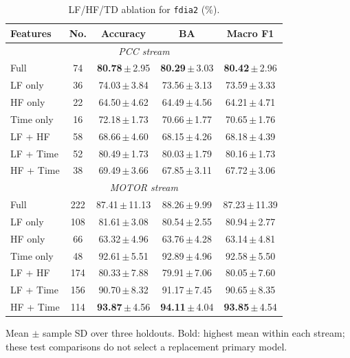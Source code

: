\documentclass[letterpaper,journal]{IEEEtran}
\begin{document}
\begin{table}[t]
\centering
\footnotesize
\caption{LF/HF/TD ablation for \texttt{fdia2} (\%).}
\label{tab:lfhf_ablation_anomaly2}
\renewcommand{\arraystretch}{1.15}
\setlength{\tabcolsep}{2.2pt}
\begin{tabular}{@{}lcccc@{}}
\hline
Features & No. & Accuracy & BA & Macro F1 \\\hline
\hline\multicolumn{5}{c}{\textit{PCC stream}} \\\hline
Full & 74 & \mbox{\textbf{80.78}\,$\pm$\,2.95} & \mbox{\textbf{80.29}\,$\pm$\,3.03} & \mbox{\textbf{80.42}\,$\pm$\,2.96} \\
LF only & 36 & \mbox{74.03\,$\pm$\,3.84} & \mbox{73.56\,$\pm$\,3.13} & \mbox{73.59\,$\pm$\,3.33} \\
HF only & 22 & \mbox{64.50\,$\pm$\,4.62} & \mbox{64.49\,$\pm$\,4.56} & \mbox{64.21\,$\pm$\,4.71} \\
Time only & 16 & \mbox{72.18\,$\pm$\,1.73} & \mbox{70.66\,$\pm$\,1.77} & \mbox{70.65\,$\pm$\,1.76} \\
LF + HF & 58 & \mbox{68.66\,$\pm$\,4.60} & \mbox{68.15\,$\pm$\,4.26} & \mbox{68.18\,$\pm$\,4.39} \\
LF + Time & 52 & \mbox{80.49\,$\pm$\,1.73} & \mbox{80.03\,$\pm$\,1.79} & \mbox{80.16\,$\pm$\,1.73} \\
HF + Time & 38 & \mbox{69.49\,$\pm$\,3.66} & \mbox{67.85\,$\pm$\,3.11} & \mbox{67.72\,$\pm$\,3.06} \\
\hline\multicolumn{5}{c}{\textit{MOTOR stream}} \\\hline
Full & 222 & \mbox{87.41\,$\pm$\,11.13} & \mbox{88.26\,$\pm$\,9.99} & \mbox{87.23\,$\pm$\,11.39} \\
LF only & 108 & \mbox{81.61\,$\pm$\,3.08} & \mbox{80.54\,$\pm$\,2.55} & \mbox{80.94\,$\pm$\,2.77} \\
HF only & 66 & \mbox{63.32\,$\pm$\,4.96} & \mbox{63.76\,$\pm$\,4.28} & \mbox{63.14\,$\pm$\,4.81} \\
Time only & 48 & \mbox{92.61\,$\pm$\,5.51} & \mbox{92.89\,$\pm$\,4.96} & \mbox{92.58\,$\pm$\,5.50} \\
LF + HF & 174 & \mbox{80.33\,$\pm$\,7.88} & \mbox{79.91\,$\pm$\,7.06} & \mbox{80.05\,$\pm$\,7.60} \\
LF + Time & 156 & \mbox{90.70\,$\pm$\,8.32} & \mbox{91.17\,$\pm$\,7.45} & \mbox{90.65\,$\pm$\,8.35} \\
HF + Time & 114 & \mbox{\textbf{93.87}\,$\pm$\,4.56} & \mbox{\textbf{94.11}\,$\pm$\,4.04} & \mbox{\textbf{93.85}\,$\pm$\,4.54} \\
\hline\end{tabular}
\par\smallskip\begin{minipage}{\columnwidth}\scriptsize Mean $\pm$ sample SD over three holdouts. Bold: highest mean within each stream; these test comparisons do not select a replacement primary model.\end{minipage}
\end{table}
\end{document}
